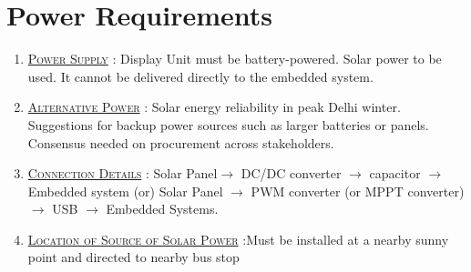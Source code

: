 \section{Power Requirements}

\begin{enumerate}
    \item {}\underline{\textsc{Power Supply}} : Display Unit must be battery-powered. Solar power to be used. It cannot be delivered directly to the embedded system.

    \item \underline{\textsc{Alternative Power}} : Solar energy reliability in peak Delhi winter. Suggestions for backup power sources such as larger batteries or panels. Consensus needed on procurement across stakeholders.

    \item \underline{\textsc{Connection Details}} : Solar Panel$\to$ DC/DC converter $\to$ capacitor $\to$ Embedded system (or)
Solar Panel $\to$ PWM converter (or MPPT converter) $\to$ USB $\to$ Embedded Systems.

    \item \underline{\textsc{Location of Source of Solar Power}} :Must be installed at a nearby sunny point and directed to nearby bus stop
\end{enumerate}